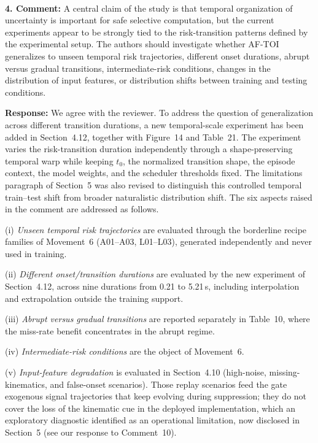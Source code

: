 \documentclass[1p,12pt,authoryear]{elsarticle}
\providecommand{\revcolor}{black}%
\begin{document}
~

\noindent \textbf{4. Comment:} A central claim of the study is that temporal organization of uncertainty is important for safe selective computation, but the current experiments appear to be strongly tied to the risk-transition patterns defined by the experimental setup. The authors should investigate whether AF-TOI generalizes to unseen temporal risk trajectories, different onset durations, abrupt versus gradual transitions, intermediate-risk conditions, changes in the distribution of input features, or distribution shifts between training and testing conditions.

\vspace{2mm}
\noindent \textbf{Response:} We agree with the reviewer. To address the question of generalization across different transition durations, a new temporal-scale experiment has been added in Section~4.12, together with Figure~14 and Table~21. The experiment varies the risk-transition duration independently through a shape-preserving temporal warp while keeping $t_0$, the normalized transition shape, the episode context, the model weights, and the scheduler thresholds fixed. The limitations paragraph of Section~5 was also revised to distinguish this controlled temporal train--test shift from broader naturalistic distribution shift. The six aspects raised in the comment are addressed as follows.

(i) \emph{Unseen temporal risk trajectories} are evaluated through the borderline recipe families of Movement~6 (A01--A03, L01--L03), generated independently and never used in training.

(ii) \emph{Different onset/transition durations} are evaluated by the new experiment of Section~4.12, across nine durations from 0.21 to 5.21\,s, including interpolation and extrapolation outside the training support.

(iii) \emph{Abrupt versus gradual transitions} are reported separately in Table~10, where the miss-rate benefit concentrates in the abrupt regime.

(iv) \emph{Intermediate-risk conditions} are the object of Movement~6.

(v) \emph{Input-feature degradation} is evaluated in Section~4.10 (high-noise, missing-kinematics, and false-onset scenarios). {\color{\revcolor}Those replay scenarios feed the gate exogenous signal trajectories that keep evolving during suppression; they do not cover the loss of the kinematic cue in the deployed implementation, which an exploratory diagnostic identified as an operational limitation, now disclosed in Section~5 (see our response to Comment~10).}
\end{document}
